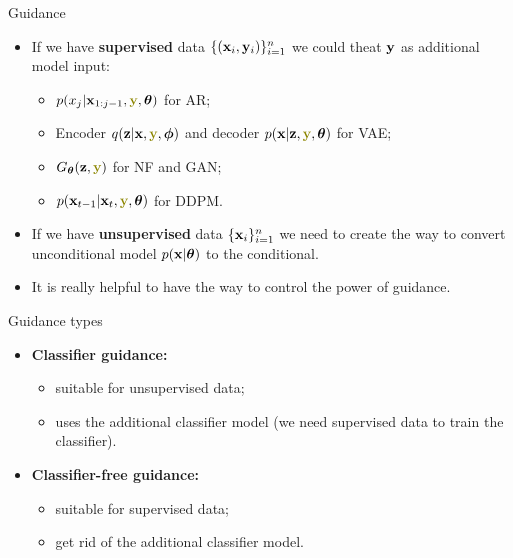 \begin{frame}{Guidance}
	\begin{itemize}
	\item If we have \textbf{supervised} data $\{(\mathbf{x}_i, \mathbf{y}_i)\}_{i=1}^n$ we could theat $\mathbf{y}$ as additional model input:
	\begin{itemize}
		\item $p(x_j | \bx_{1:j-1}, {\color{olive}\by}, \btheta)$ for AR;
		\item Encoder $q(\bz | \bx, {\color{olive}\by}, \bphi)$ and decoder $p(\bx | \bz, {\color{olive}\by}, \btheta)$ for VAE;
		\item $G_{\btheta}(\bz, {\color{olive}\by})$ for NF and GAN;
		\item $p(\bx_{t-1} | \bx_t, {\color{olive}\by}, \btheta)$ for DDPM.
	\end{itemize}
	\item If we have \textbf{unsupervised} data $\{\mathbf{x}_i\}_{i=1}^n$ we need to create the way to convert unconditional model $p(\mathbf{x} | \boldsymbol{\theta})$ to the conditional.
	\item It is really helpful to have the way to control the power of guidance.
	\end{itemize}
	\begin{block}{Guidance types}
		\begin{itemize}
			\item \textbf{Classifier guidance:} 
				\begin{itemize}
					\item suitable for unsupervised data;
					\item uses the additional classifier model (we need supervised data to train the classifier).
				\end{itemize}
			\item \textbf{Classifier-free guidance:} 
				\begin{itemize}
					\item suitable for supervised data;
					\item get rid of the additional classifier model.
				\end{itemize}
		\end{itemize}
	\end{block}
\end{frame}
